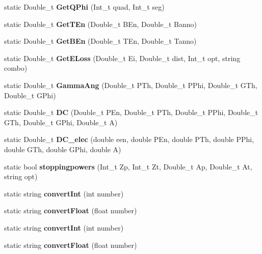 \begin{DoxyCompactItemize}
\item 
\mbox{\label{classdoppler_ab8fcb952d529bbd30d147bf34f159c73}} 
static Double\+\_\+t {\bfseries Get\+Q\+Phi} (Int\+\_\+t quad, Int\+\_\+t seg)
\item 
\mbox{\label{classdoppler_aec7a929023626e54c17d4c83f2a6d2c3}} 
static Double\+\_\+t {\bfseries Get\+T\+En} (Double\+\_\+t B\+En, Double\+\_\+t Banno)
\item 
\mbox{\label{classdoppler_ad9a413e3272258f7ad88abeb2760bdbc}} 
static Double\+\_\+t {\bfseries Get\+B\+En} (Double\+\_\+t T\+En, Double\+\_\+t Tanno)
\item 
\mbox{\label{classdoppler_a154716ffad9dc13095b9accdd8197e04}} 
static Double\+\_\+t {\bfseries Get\+E\+Loss} (Double\+\_\+t Ei, Double\+\_\+t dist, Int\+\_\+t opt, string combo)
\item 
\mbox{\label{classdoppler_abdefc570d0519bd0e99f9a92d22707de}} 
static Double\+\_\+t {\bfseries Gamma\+Ang} (Double\+\_\+t P\+Th, Double\+\_\+t P\+Phi, Double\+\_\+t G\+Th, Double\+\_\+t G\+Phi)
\item 
\mbox{\label{classdoppler_a4eada56b71bec8f2218c6487431ed3f7}} 
static Double\+\_\+t {\bfseries DC} (Double\+\_\+t P\+En, Double\+\_\+t P\+Th, Double\+\_\+t P\+Phi, Double\+\_\+t G\+Th, Double\+\_\+t G\+Phi, Double\+\_\+t A)
\item 
\mbox{\label{classdoppler_a2d42bc47c077b472a9cbdd500d8092bc}} 
static Double\+\_\+t {\bfseries D\+C\+\_\+elec} (double een, double P\+En, double P\+Th, double P\+Phi, double G\+Th, double G\+Phi, double A)
\item 
\mbox{\label{classdoppler_add47e854c8b41d33ff6054c8daf0d163}} 
static bool {\bfseries stoppingpowers} (Int\+\_\+t Zp, Int\+\_\+t Zt, Double\+\_\+t Ap, Double\+\_\+t At, string opt)
\item 
\mbox{\label{classdoppler_a34a6c6112ce5e719a13a722353c8214f}} 
static string {\bfseries convert\+Int} (int number)
\item 
\mbox{\label{classdoppler_a3148106ce3d9d4861c505dab61ed7aae}} 
static string {\bfseries convert\+Float} (float number)
\item 
\mbox{\label{classdoppler_a34a6c6112ce5e719a13a722353c8214f}} 
static string {\bfseries convert\+Int} (int number)
\item 
\mbox{\label{classdoppler_a3148106ce3d9d4861c505dab61ed7aae}} 
static string {\bfseries convert\+Float} (float number)
\end{DoxyCompactItemize}
